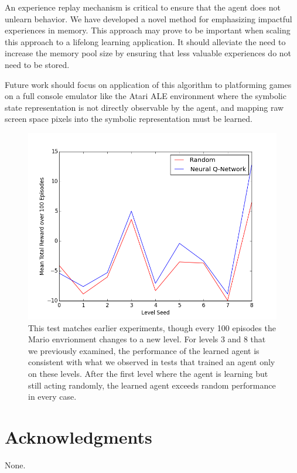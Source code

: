 \documentclass{article}
\begin{document}
 An experience replay mechanism is critical to ensure that the agent does not unlearn behavior. We have developed a novel method for emphasizing impactful experiences in memory. This approach may prove to be important when scaling this approach to a lifelong learning application. It should alleviate the need to increase the memory pool size by ensuring that less valuable experiences do not need to be stored.
 
Future work should focus on application of this algorithm to platforming games on a full console emulator like the Atari ALE environment where the symbolic state representation is not directly observable by the agent, and mapping raw screen space pixels into the symbolic representation must be learned.
 
 \begin{figure}
\begin{center}
\includegraphics[scale=0.42]{transfer_levels.png}
\caption{This test matches earlier experiments, though every 100 episodes the Mario envrionment changes to a new level. For levels 3 and 8 that we previously examined, the performance of the learned agent is consistent with what we observed in tests that trained an agent only on these levels. After the first level where the agent is learning but still acting randomly, the learned agent exceeds random performance in every case.}
\end{center}
\end{figure}
 
\section*{Acknowledgments} 
 
None.



\end{document}
